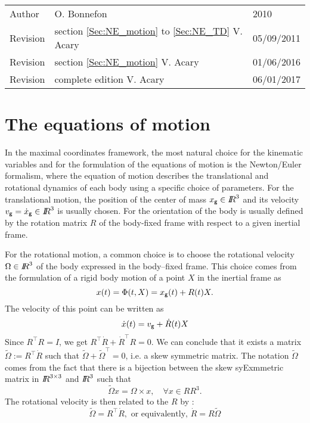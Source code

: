 


\begin{tabular}{lll}
  \centering
  Author &  O. Bonnefon &2010\\
  Revision& section \ref{Sec:NE_motion} to \ref{Sec:NE_TD} V. Acary&  05/09/2011\\
  Revision& section \ref{Sec:NE_motion}  V. Acary&  01/06/2016\\
  Revision& complete edition V. Acary&  06/01/2017\\

\end{tabular}


\section{The equations of motion}


\def\cg{\sf \small g}
In the maximal coordinates framework, the most natural choice for the kinematic  variables and for the formulation of the equations of motion is the Newton/Euler formalism, where the equation of motion describes the translational and rotational dynamics of each body using a specific choice of parameters. For the translational motion, the position of the center of mass $x_{\cg}\in \RR^3$ and its velocity  $v_{\cg} = \dot x_{\cg} \in \RR^3$ is usually chosen. For the orientation of the body is usually defined by the rotation matrix $R$ of the body-fixed frame with respect to a given inertial frame.

For the rotational motion, a common choice is to choose the rotational velocity  $\Omega \in \mbox{\rm $I\!\!R$}^3$ of the body expressed in the body--fixed frame. This choice comes from the formulation of a rigid body motion of a point $X$ in the inertial frame as
\begin{equation}
  \label{eq:1}
  x(t) = \Phi(t,X) = x_{\cg}(t) + R(t) X.
\end{equation}
The velocity of this point can be written as
\begin{equation}
  \label{eq:2}
  \dot x(t) = v_{\cg} + \dot R(t) X
\end{equation}
Since $R^\top R=I$, we get $R^\top \dot R + \dot R^\top R =0$. We can conclude that it exists a matrix $\tilde \Omega := R^\top \dot R $ such that $\tilde \Omega + \tilde \Omega^\top=0$, i.e. a skew symmetric matrix. The notation $\tilde \Omega$ comes from the fact that there is a bijection between the skew syExmmetric matrix in $\mbox{\rm $I\!\!R$}^{3\times3}$ and $\mbox{\rm $I\!\!R$}^3$ such that
\begin{equation}
  \label{eq:3}
  \tilde \Omega x  = \Omega \times x, \quad \forall x\in RR^3.
\end{equation}
The rotational velocity is then related to the $R$ by :
\begin{equation}
  \label{eq:angularvelocity}
  \widetilde \Omega = R^\top \dot R, \text { or equivalently, } \dot R  = R \widetilde \Omega
\end{equation}



